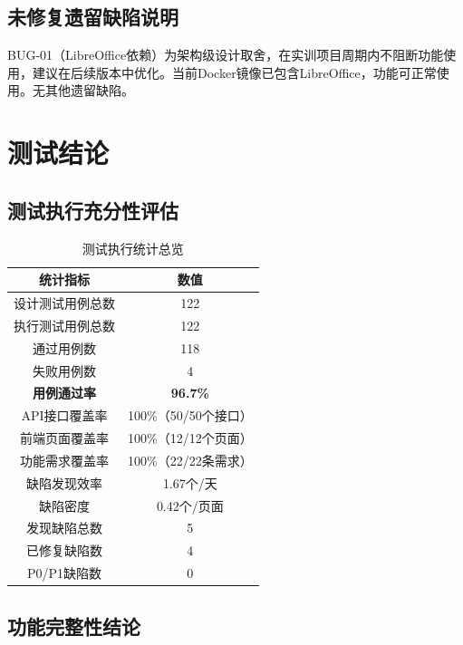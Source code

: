 \subsection{未修复遗留缺陷说明}

BUG-01（LibreOffice依赖）为架构级设计取舍，在实训项目周期内不阻断功能使用，建议在后续版本中优化。当前Docker镜像已包含LibreOffice，功能可正常使用。无其他遗留缺陷。

\section{测试结论}

\subsection{测试执行充分性评估}

\begin{table}[htbp]
    \centering
    \caption{测试执行统计总览}
    \begin{tabular}{|c|c|}
        \hline
        \textbf{统计指标} & \textbf{数值} \\
        \hline
        设计测试用例总数 & 122 \\
        \hline
        执行测试用例总数 & 122 \\
        \hline
        通过用例数 & 118 \\
        \hline
        失败用例数 & 4 \\
        \hline
        \textbf{用例通过率} & \textbf{96.7\%} \\
        \hline
        API接口覆盖率 & 100\%（50/50个接口） \\
        \hline
        前端页面覆盖率 & 100\%（12/12个页面） \\
        \hline
        功能需求覆盖率 & 100\%（22/22条需求） \\
        \hline
        缺陷发现效率 & 1.67个/天 \\
        \hline
        缺陷密度 & 0.42个/页面 \\
        \hline
        发现缺陷总数 & 5 \\
        \hline
        已修复缺陷数 & 4 \\
        \hline
        P0/P1缺陷数 & 0 \\
        \hline
    \end{tabular}
\end{table}

\subsection{功能完整性结论}

